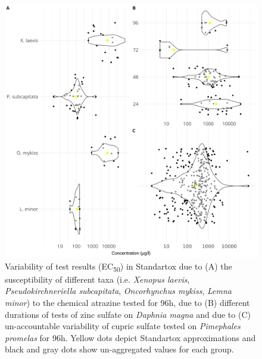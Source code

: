 \begin{figure}[h!]
    \includegraphics[width=1.0\textwidth]{article/figures/results_variability.png}
    \caption{Variability of test results (EC\textsubscript{50}) in Standartox due to (A) the susceptibility of different taxa (i.e. \textit{Xenopus laevis}, \textit{Pseudokirchneriella subcapitata}, \textit{Oncorhynchus mykiss}, \textit{Lemna minor}) to the chemical atrazine tested for 96h, due to (B) different durations of tests of zinc sulfate on \textit{Daphnia magna} and due to (C) un-accountable variability of cupric sulfate tested on \textit{Pimephales promelas} for 96h. Yellow dots depict Standartox approximations and black and gray dots show un-aggregated values for each group.}
    \label{fig:stx-variability}
\end{figure}

